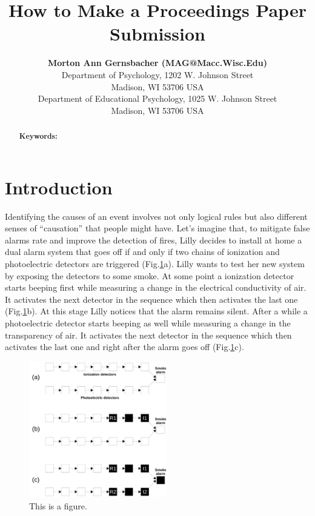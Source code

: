 \documentclass[10pt,letterpaper]{article}
\title{How to Make a Proceedings Paper Submission}
\author{{\large \bf Morton Ann Gernsbacher (MAG@Macc.Wisc.Edu)} \\
  Department of Psychology, 1202 W. Johnson Street \\
  Madison, WI 53706 USA
  \AND {\large \bf Sharon J.~Derry (SDJ@Macc.Wisc.Edu)} \\
  Department of Educational Psychology, 1025 W. Johnson Street \\
  Madison, WI 53706 USA}
\begin{document}
\maketitle


\begin{abstract}

\textbf{Keywords:} 
\end{abstract}


\section{Introduction}

Identifying the causes of an event involves not only logical rules but also different senses of ``causation'' that people might have. Let's imagine that, to mitigate false alarms rate and improve the detection of fires, Lilly decides to install at home a dual alarm system that goes off if and only if two chains of ionization and photoelectric detectors are triggered (Fig.\ref{fig:1}a). Lilly wants to test her new system by exposing the detectors to some smoke. At some point a ionization detector starts beeping first while measuring a change in the electrical conductivity of air. It activates the next detector in the sequence which then activates the last one (Fig.\ref{fig:1}b). At this stage Lilly notices that the alarm remains silent. After a while a photoelectric detector starts beeping as well while measuring a change in the transparency of air. It activates the next detector in the sequence which then activates the last one and right after the alarm goes off (Fig.\ref{fig:1}c). 

\begin{figure}[h]
\begin{center}
\includegraphics[width=6cm]{intro}
\end{center}
\caption{This is a figure.} 
\label{fig:1}
\end{figure}
\end{document}

